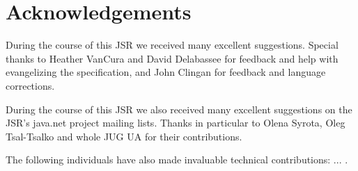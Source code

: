 \section{Acknowledgements}
\label{acks}

During the course of this JSR we received many excellent suggestions.
Special thanks to Heather VanCura and David Delabassee for feedback and help with 
evangelizing the specification, and John Clingan for feedback and language corrections.

During the course of this JSR we also received many excellent suggestions on the JSR's java.net project mailing lists. 
Thanks in particular to Olena Syrota, Oleg Tsal-Tsalko and whole JUG UA for their contributions.

The following individuals have also made invaluable technical contributions: ... .
